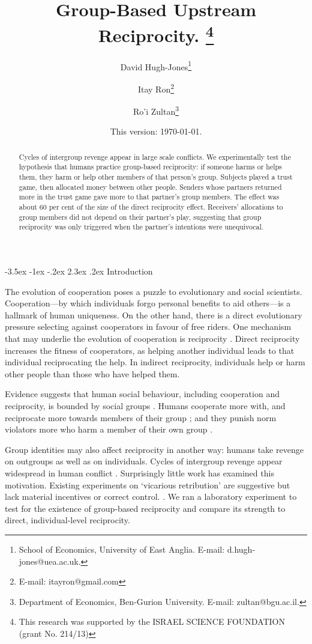 \documentclass[12pt,a4paper]{article}
\title{\bf\sffamily %
Group-Based Upstream Reciprocity.%
\thanks{
This research was supported by the ISRAEL SCIENCE FOUNDATION (grant No. 214/13)
}}
\author{David Hugh-Jones\thanks{School of Economics, University of East Anglia. E-mail: d.hugh-jones@uea.ac.uk.} \and Itay Ron\thanks{E-mail: itayron@gmail.com} \and Ro'i Zultan\thanks{Department of Economics, Ben-Gurion University. E-mail: zultan@bgu.ac.il.}}
\date{\sffamily \small This version: \today.} %
\makeatletter
\renewcommand\section{\@startsection {section}{1}{\z@}%
{-3.5ex \@plus -1ex \@minus -.2ex}%
{2.3ex \@plus.2ex}%
{\bf\sffamily\Large}}
\makeatother
\begin{document}
\maketitle

\begin{abstract}
Cycles of intergroup revenge appear in large scale conflicts. We experimentally test the hypothesis that humans
practice group-based reciprocity: if someone harms or helps them,
they harm or help other members of that person's group. Subjects played a trust game, then allocated money between other people.
Senders whose partners returned more in the trust game gave more to that partner's group members. The effect was about 60 per cent
of the size of the direct reciprocity effect. Receivers' allocations to group members did not depend on their partner's play, suggesting
that group reciprocity was only triggered when the partner's intentions were unequivocal.
\end{abstract}

\section{Introduction}

The evolution of cooperation poses a puzzle to evolutionary and social scientists. Cooperation---by which individuals forgo personal benefits to aid others---is a hallmark of human uniqueness. On the other hand, there is a direct evolutionary pressure selecting against cooperators in favour of free riders. One mechanism that may underlie the evolution of cooperation is reciprocity \citet{nowak2006five,nowak2012evolving,}. Direct reciprocity increases the fitness of cooperators, as helping another individual leads to that individual reciprocating the help. In indirect reciprocity, individuals help or harm other people than those who have helped them.

Evidence suggests that human social behaviour, including cooperation and reciprocity, is bounded by social groups \citep*{tajfel1979integrative,balliet2014ingroup,DeDreu2014}. Humans cooperate more with, and reciprocate more towards members of their group \citep*{chen2009group,chen2011potential}; and they punish norm violators more who harm a member of their own group \citep*{bernhard2006group,bernhard2006parochial}.


Group identities may also affect reciprocity in another way: humans take revenge on outgroups as well as on individuals. Cycles of intergroup revenge appear widespread in human conflict \citep*{}. Surprisingly little work has examined this motivation. Existing experiments on `vicarious retribution' are suggestive but lack material incentives or correct control. \citep*{XXX}. We ran a laboratory experiment to test for the existence of group-based reciprocity and compare its strength to direct, individual-level reciprocity.
\end{document}
